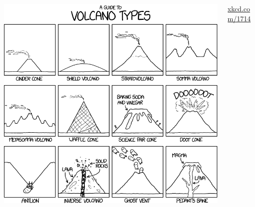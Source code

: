 \documentclass[10pt,a4paper]{beamer}
\theoremstyle{plain}
\theoremstyle{definition}
\theoremstyle{definition}
\theoremstyle{definition}
\theoremstyle{definition}
\theoremstyle{remark}
\theoremstyle{remark}
\begin{document}
\begin{frame}
    \begin{columns}
        \begin{column}{0.8\textwidth}
            \includegraphics[height=\textheight]{Images/xkcd.png}
        \end{column}
        \begin{column}{0.2\textwidth}
            \href{http://xkcd.com/1714/}{xkcd.com/1714}
        \end{column}
    \end{columns}
\end{frame}

\end{document}

